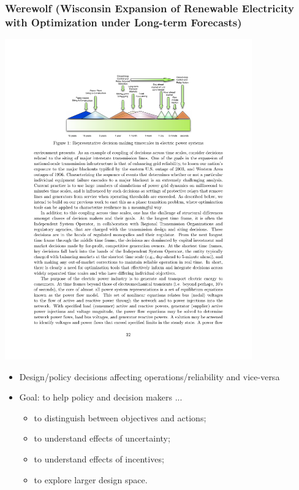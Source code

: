 \documentclass[xcolor=dvipsnames]{beamer}
\begin{document}
\begin{frame}
  \frametitle{Werewolf (Wisconsin Expansion of Renewable Electricity with Optimization under Long-term Forecasts)}

  \centering
  \includegraphics[width=0.8\textwidth]{includes/timescales.pdf}

  \begin{itemize}
  \item Design/policy decisions affecting operations/reliability and vice-versa
  \item Goal: to help policy and decision makers ...
    \begin{itemize}
    \item to distinguish between objectives and actions;
    \item to understand effects of uncertainty;
    \item to understand effects of incentives;
    \item to explore larger design space.
    \end{itemize}
  \end{itemize}

\end{frame}
\end{document}
